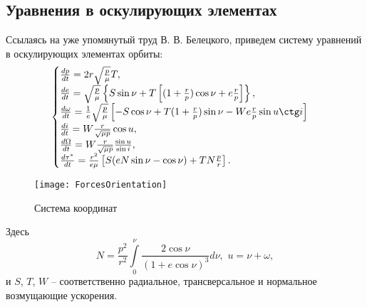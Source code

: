 \subsection{Уравнения в оскулирующих элементах}
\noindent\indent Ссылаясь на уже упомянутый труд В. В. Белецкого, приведем систему уравнений
в оскулирующих элементах орбиты:
\begin{equation}
  \begin{cases}
    \frac{dp}{dt} = 2r\sqrt{\frac{p}{\mu}}T, \\
    \frac{de}{dt} = \sqrt{\frac{p}{\mu}}\left\{
      S\sin\nu + T\left[(1 + \frac{r}{p})\cos\nu + e\frac{r}{p}\right]
    \right\}, \\
    \frac{d\omega}{dt} = \frac{1}{e}\sqrt{\frac{p}{\mu}}\left[
      -S\cos\nu + T(1 + \frac{r}{p})\sin\nu - W e\frac{r}{p}\sin u\ctg i
    \right] \\
    \frac{di}{dt} = W \frac{r}{\sqrt{\mu p}}\cos u, \\
    \frac{d\Omega}{dt} = W \frac{r}{\sqrt{\mu p}}\frac{\sin u}{\sin i}, \\
    \frac{d\tau^*}{dt} = \frac{r^2}{e\mu}\left[
      S (eN\sin\nu - \cos\nu) + T N\frac{p}{r}
    \right].
  \end{cases}
\end{equation}\par
\begin{figure}[h]
  \centering
  \texttt{[image: ForcesOrientation]}
  \caption{Система координат}
  \label{fig:ForcesOrientation}
\end{figure}\par
Здесь
\begin{equation}
  N = \frac{p^2}{r^2}\int\limits_0^{\nu} \frac{2\cos\nu}{(1 + e\cos\nu)^3}d\nu,\,\,
  u = \nu + \omega,
\end{equation}
и $S$, $T$, $W$ -- соответственно радиальное, трансверсальное и нормальное возмущающие
ускорения.\par
